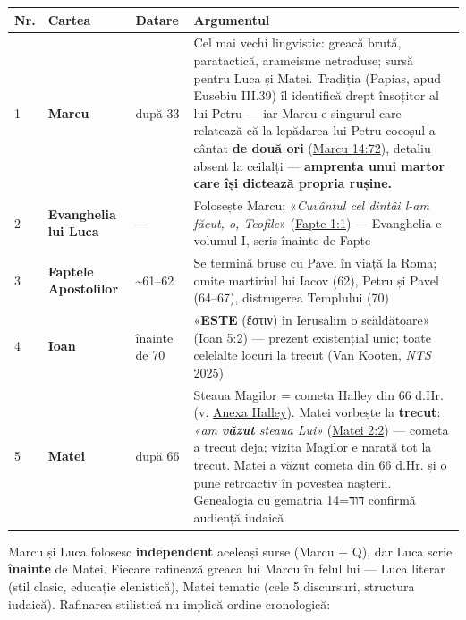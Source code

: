 \documentclass[12pt,a4paper,twoside,openany]{book}
\begin{document}
\begin{center}
\small
\begin{tabularx}{\textwidth}{L{0.6cm}L{1.8cm}L{1.5cm}X}
\toprule
{}
\textbf{Nr.} & \textbf{Cartea} & \textbf{Datare} & \textbf{Argumentul} \\
 & \textbf{Marcu} & după 33 & Cel mai vechi lingvistic: greacă brută, paratactică, arameisme netraduse; sursă pentru Luca și Matei. Tradiția (Papias, apud Eusebiu III.39) îl identifică drept însoțitor al lui Petru — iar Marcu e singurul care relatează că la lepădarea lui Petru cocoșul a cântat \textbf{de două ori} (\href{https://bibliaortodoxa.ro/carte.php?id=53\&cap=14\#72}{Marcu 14:72}), detaliu absent la ceilalți — \textbf{amprenta unui martor care își dictează propria rușine.} \\
2 & \textbf{Evanghelia lui Luca} & — & Folosește Marcu; «\textit{Cuvântul cel dintâi l-am făcut, o, Teofile}» (\href{https://bibliaortodoxa.ro/carte.php?id=26\&cap=1\#1}{Fapte 1:1}) — Evanghelia e volumul I, scris înainte de Fapte \\
3 & \textbf{Faptele Apostolilor} & \textasciitilde{}61–62 & Se termină brusc cu Pavel în viață la Roma; omite martiriul lui Iacov (62), Petru și Pavel (64–67), distrugerea Templului (70) \\
4 & \textbf{Ioan} & înainte de 70 & «\textbf{ESTE} (ἔστιν) în Ierusalim o scăldătoare» (\href{https://bibliaortodoxa.ro/carte.php?id=35\&cap=5\#2}{Ioan 5:2}) — prezent existențial unic; toate celelalte locuri la trecut (Van Kooten, \textit{NTS} 2025) \\
5 & \textbf{Matei} & după 66 & Steaua Magilor = cometa Halley din 66 d.Hr. (v. \href{\#halley}{Anexa Halley}). Matei vorbește la \textbf{trecut}: \textit{«am \textbf{văzut} steaua Lui»} (\href{https://bibliaortodoxa.ro/carte.php?id=55\&cap=2\#2}{Matei 2:2}) — cometa a trecut deja; vizita Magilor e narată tot la trecut. Matei a văzut cometa din 66 d.Hr. și o pune retroactiv în povestea nașterii. Genealogia cu gematria דוד=14 confirmă audiență iudaică \\
\bottomrule
\end{tabularx}
\end{center}
\normalsize
Marcu și Luca folosesc \textbf{independent} aceleași surse (Marcu + Q), dar Luca scrie \textbf{înainte} de Matei. Fiecare rafinează greaca lui Marcu în felul lui — Luca literar (stil clasic, educație elenistică), Matei tematic (cele 5 discursuri, structura iudaică). Rafinarea stilistică nu implică ordine cronologică:
\end{document}
